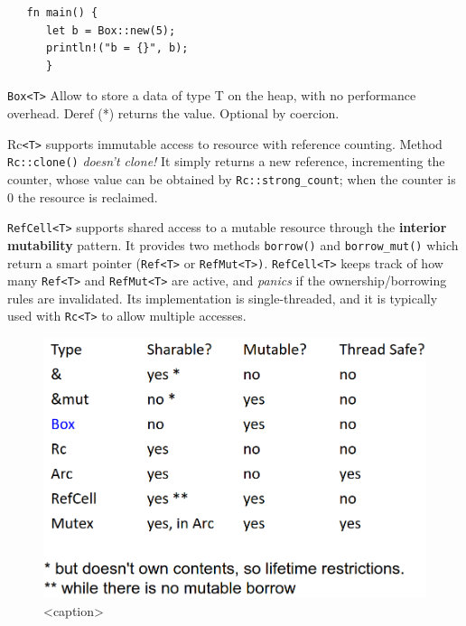 \begin{lstlisting}
   fn main() {
      let b = Box::new(5);
      println!("b = {}", b);
      }
\end{lstlisting}

\lstinline|Box<T>| Allow to store a data of type T on the heap, with no performance overhead.
Deref (*) returns the value. Optional by coercion.

Rc\lstinline|<T>| supports immutable access to resource with
reference counting.
Method \lstinline|Rc::clone()| \emph{doesn’t clone!}
It simply returns a new reference, incrementing the counter,
whose value can be obtained by \lstinline|Rc::strong_count|;
when the counter is 0 the resource is reclaimed.


\lstinline|RefCell<T>| supports shared access to a mutable
resource through the \textbf{interior mutability} pattern.
It provides two methods \lstinline|borrow()| and \lstinline|borrow_mut()| which
return a smart pointer (\lstinline|Ref<T>| or \lstinline|RefMut<T>)|.
\lstinline|RefCell<T>| keeps track of how many \lstinline|Ref<T>| and
\lstinline|RefMut<T>| are active, and \textit{panics} if the
ownership/borrowing rules are invalidated.
Its implementation is single-threaded, and it is typically used with \lstinline|Rc<T>| to allow multiple accesses.

\begin{figure}[htbp]
   \centering
   \includegraphics{images/smartpointers.png}
   \caption{<caption>}
   \label{<label>}
\end{figure}